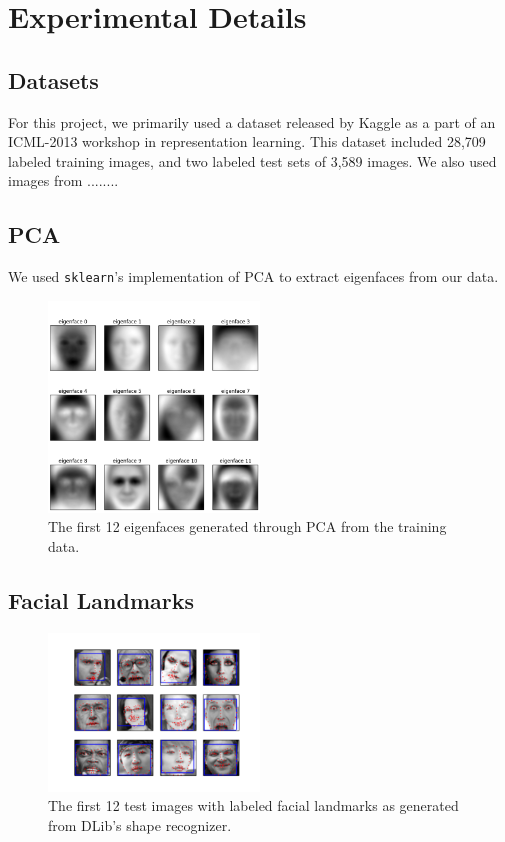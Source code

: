 \documentclass[11pt, twocolumn, twoside]{article}
\begin{document}
\section{Experimental Details}

\subsection{Datasets}

For this project, we primarily used a dataset released by Kaggle as a part of an
ICML-2013 workshop in representation learning. This dataset included 28,709 labeled
training images, and two labeled test sets of 3,589 images. We also used images from
........

\subsection{PCA}
We used \texttt{sklearn}'s implementation of PCA to extract eigenfaces from our data.

\begin{figure}
\centering
\includegraphics[width=0.5\textwidth]{eigenfaces}
\caption{\label{fig:eigenfaces} The first 12 eigenfaces generated through PCA from the
training data.}
\end{figure}

\subsection{Facial Landmarks}


\begin{figure}
\centering
\includegraphics[width=0.5\textwidth]{landmarks}
\caption{\label{fig:landmarks} The first 12 test images with labeled facial landmarks
as generated from DLib's shape recognizer.}
\end{figure}
\end{document}

